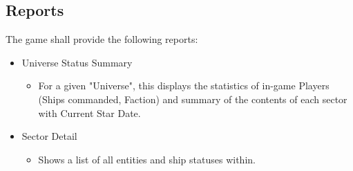 \subsection{Reports}

The game shall provide the following reports:

\begin{itemize}
	\item Universe Status Summary
	\begin{itemize}
		\item For a given "Universe", this displays the statistics of in-game Players (Ships commanded, Faction) and summary of the contents of each sector with Current Star Date.
	\end{itemize}
	\item Sector Detail
	\begin{itemize}
		\item Shows a list of all entities and ship statuses within.
	\end{itemize}
\end{itemize}
